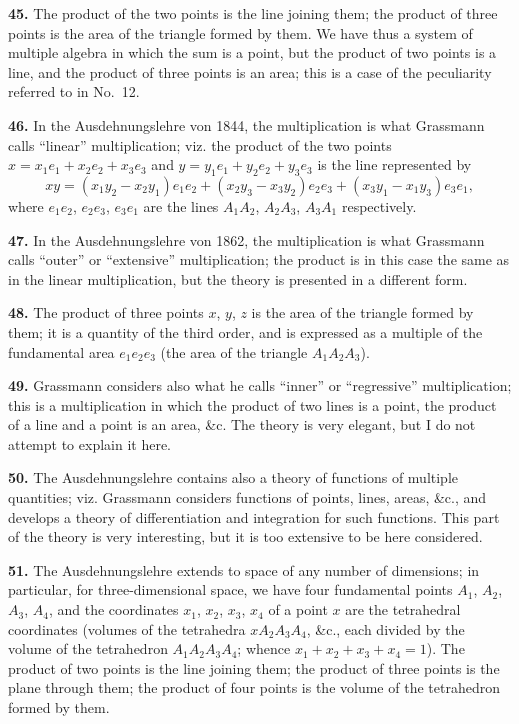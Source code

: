 \documentclass[11pt,a4paper]{book}
\begin{document}
\textbf{45.} The product of the two points is the line joining them; the product of three points is the area of the triangle formed by them. We have thus a system of multiple algebra in which the sum is a point, but the product of two points is a line, and the product of three points is an area; this is a case of the peculiarity referred to in No.~12.

\textbf{46.} In the Ausdehnungslehre von 1844, the multiplication is what Grassmann calls ``linear'' multiplication; viz. the product of the two points $x = x_1e_1 + x_2e_2 + x_3e_3$ and $y = y_1e_1 + y_2e_2 + y_3e_3$ is the line represented by
\[
xy = (x_1y_2 - x_2y_1)e_1e_2 + (x_2y_3 - x_3y_2)e_2e_3 + (x_3y_1 - x_1y_3)e_3e_1,
\]
where $e_1e_2$, $e_2e_3$, $e_3e_1$ are the lines $A_1A_2$, $A_2A_3$, $A_3A_1$ respectively.

\textbf{47.} In the Ausdehnungslehre von 1862, the multiplication is what Grassmann calls ``outer'' or ``extensive'' multiplication; the product is in this case the same as in the linear multiplication, but the theory is presented in a different form.

\textbf{48.} The product of three points $x$, $y$, $z$ is the area of the triangle formed by them; it is a quantity of the third order, and is expressed as a multiple of the fundamental area $e_1e_2e_3$ (the area of the triangle $A_1A_2A_3$).

\textbf{49.} Grassmann considers also what he calls ``inner'' or ``regressive'' multiplication; this is a multiplication in which the product of two lines is a point, the product of a line and a point is an area, \&c. The theory is very elegant, but I do not attempt to explain it here.

\textbf{50.} The Ausdehnungslehre contains also a theory of functions of multiple quantities; viz. Grassmann considers functions of points, lines, areas, \&c., and develops a theory of differentiation and integration for such functions. This part of the theory is very interesting, but it is too extensive to be here considered.

\textbf{51.} The Ausdehnungslehre extends to space of any number of dimensions; in particular, for three-dimensional space, we have four fundamental points $A_1$, $A_2$, $A_3$, $A_4$, and the coordinates $x_1$, $x_2$, $x_3$, $x_4$ of a point $x$ are the tetrahedral coordinates (volumes of the tetrahedra $xA_2A_3A_4$, \&c., each divided by the volume of the tetrahedron $A_1A_2A_3A_4$; whence $x_1 + x_2 + x_3 + x_4 = 1$). The product of two points is the line joining them; the product of three points is the plane through them; the product of four points is the volume of the tetrahedron formed by them.
\end{document}
